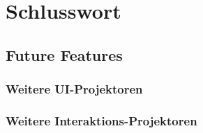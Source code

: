 \chapter{Schlusswort}
\label{chap:end}


\section{Future Features}
\label{sec:future}


\subsection{Weitere UI-Projektoren}
\label{sec:moreUi}


\subsection{Weitere Interaktions-Projektoren}
\label{sec:moreInteraction}


